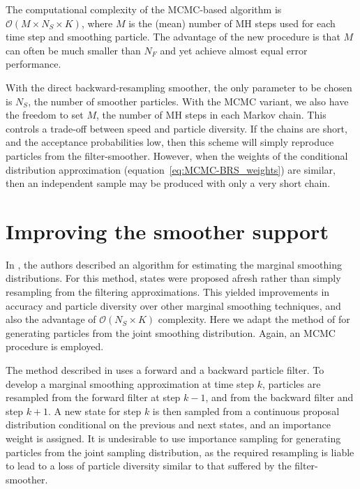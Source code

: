 \documentclass[journal]{IEEEtran}
\begin{document}
The computational complexity of the MCMC-based algorithm is $\mathcal{O}(M \times N_S \times K)$, where $M$ is the (mean) number of MH steps used for each time step and smoothing particle. The advantage of the new procedure is that $M$ can often be much smaller than $N_F$ and yet achieve almost equal error performance.

With the direct backward-resampling smoother, the only parameter to be chosen is $N_S$, the number of smoother particles. With the MCMC variant, we also have the freedom to set $M$, the number of MH steps in each Markov chain. This controls a trade-off between speed and particle diversity. If the chains are short, and the acceptance probabilities low, then this scheme will simply reproduce particles from the filter-smoother. However, when the weights of the conditional distribution approximation (equation~\ref{eq:MCMC-BRS_weights}) are similar, then an independent sample may be produced with only a very short chain.



\section{Improving the smoother support} \label{sec:new_state_smoother}

In \cite{Fearnhead2010}, the authors described an algorithm for estimating the marginal smoothing distributions. For this method, states were proposed afresh rather than simply resampling from the filtering approximations. This yielded improvements in accuracy and particle diversity over other marginal smoothing techniques, and also the advantage of $\mathcal{O}(N_S \times K)$ complexity. Here we adapt the method of \cite{Fearnhead2010} for generating particles from the joint smoothing distribution. Again, an MCMC procedure is employed.

The method described in \cite{Fearnhead2010} uses a forward and a backward particle filter. To develop a marginal smoothing approximation at time step $k$, particles are resampled from the forward filter at step $k-1$, and from the backward filter and step $k+1$. A new state for step $k$ is then sampled from a continuous proposal distribution conditional on the previous and next states, and an importance weight is assigned. It is undesirable to use importance sampling for generating particles from the joint sampling distribution, as the required resampling is liable to lead to a loss of particle diversity similar to that suffered by the filter-smoother.
\end{document}
